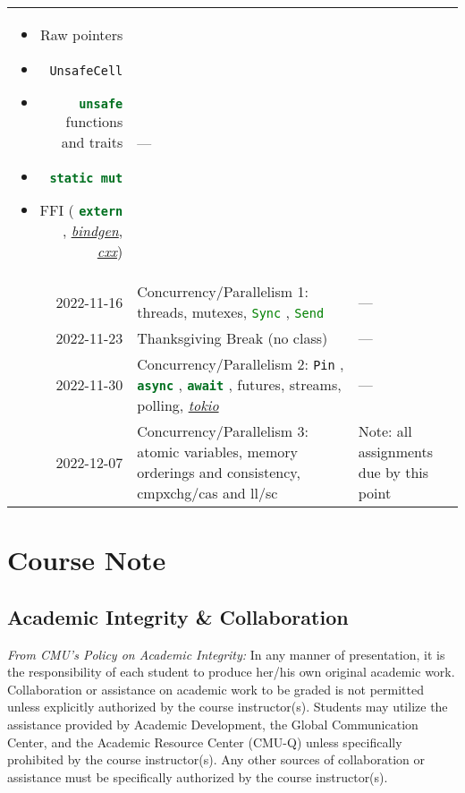 \documentclass{article}
\newcommand{\code}[2][]{{\sloppy
\ifmmode
\text{\lstinline[language=rust,#1]`#2`}
\else
{\lstinline[language=rust,#1]`#2`}%
\fi}}
\begin{document}
\begin{longtable}{rp{}@{\hskip .05\textwidth}p{}}
\begin{itemize}
                        \item Raw pointers
                        \item \code{UnsafeCell}
                        \item \code{unsafe} functions and traits
                        \item \code{static mut}
                        \item FFI (\code{extern},
                            \href{https://github.com/rust-lang/rust-bindgen}{\textit{bindgen}},
                            \href{https://github.com/dtolnay/cxx}{\textit{cxx}})
                    \end{itemize}
                & ---                                                       \\
    2022-11-16  & Concurrency/Parallelism 1: threads, mutexes,
                  \code{Sync}, \code{Send}
                & ---                                                       \\
    2022-11-23  & Thanksgiving Break (no class)
                & ---                                                       \\
    2022-11-30  & Concurrency/Parallelism 2: \code{Pin}, \code{async},
                  \code{await}, futures, streams, polling,
                  \href{https://tokio.rs/}{\textit{tokio}}
                & ---                                                       \\
    2022-12-07  & Concurrency/Parallelism 3: atomic variables, memory orderings
                  and consistency, cmpxchg/cas and ll/sc
                & Note: all assignments due by this point                   \\
    \bottomrule
\end{longtable}

\section*{Course Note}

\subsection*{Academic Integrity \& Collaboration}

\textit{From CMU's Policy on Academic Integrity:} In any manner of presentation,
it is the responsibility of each student to produce her/his own original
academic work. Collaboration or assistance on academic work to be graded is not
permitted unless explicitly authorized by the course instructor(s). Students may
utilize the assistance provided by Academic Development, the Global
Communication Center, and the Academic Resource Center (CMU-Q) unless
specifically prohibited by the course instructor(s). Any other sources of
collaboration or assistance must be specifically authorized by the course
instructor(s).
 
\end{document}
